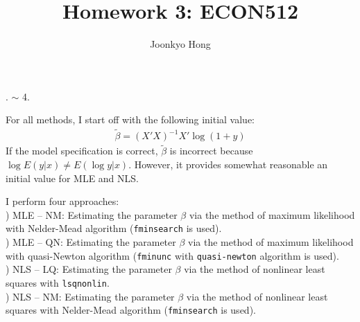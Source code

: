 \documentclass[10pt, letterpaper]{article}
\begin{document}
\title{Homework 3: ECON512}
\author{Joonkyo Hong}
\date{}
\maketitle
\smallskip

. $\sim$ 4.

\noindent For all methods, I start off with the following initial value:
\begin{align}
\tilde{\beta} = (X'X)^{-1}X'\log(1+y) \nonumber
\end{align} 
If the model specification is correct, $\tilde{\beta}$ is incorrect because $\log E(y|x) \neq E(\log y|x)$. However, it provides somewhat reasonable an initial value for MLE and NLS.

I perform four approaches:\\

) MLE -- NM: Estimating the parameter $\beta$ via the method of maximum likelihood with Nelder-Mead algorithm ({\tt fminsearch} is used).\\

) MLE -- QN: Estimating the parameter $\beta$ via the method of maximum likelihood with quasi-Newton algorithm ({\tt fminunc} with {\tt quasi-newton} algorithm is used).\\

) NLS -- LQ: Estimating the parameter $\beta$ via the method of nonlinear least squares with {\tt lsqnonlin}.\\

) NLS -- NM: Estimating the parameter $\beta$ via the method of nonlinear least squares with Nelder-Mead algorithm ({\tt fminsearch} is used).\\
\end{document}
